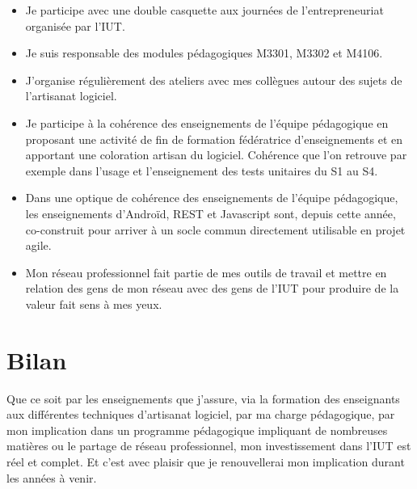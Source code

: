\documentclass[a4paper]{article}
\begin{document}
\begin{itemize}
  \item Je participe avec une double casquette aux journées de l'entrepreneuriat organisée par l'IUT.
  \item Je suis responsable des modules pédagogiques M3301, M3302 et M4106.
  \item J'organise régulièrement des ateliers avec mes collègues autour des sujets de l'artisanat logiciel.
  \item Je participe à la cohérence des enseignements de l'équipe pédagogique en proposant une activité de fin de formation fédératrice d'enseignements et en apportant une coloration artisan du logiciel. Cohérence que l'on retrouve par exemple dans l'usage et l'enseignement des tests unitaires du S1 au S4.
  \item Dans une optique de cohérence des enseignements de l'équipe pédagogique, les enseignements d'Androïd, REST et Javascript sont, depuis cette année, co-construit pour arriver à un socle commun directement utilisable en projet agile.
  \item Mon réseau professionnel fait partie de mes outils de travail et mettre en relation des gens de mon réseau avec des gens de l'IUT pour produire de la valeur fait sens à mes yeux.
\end{itemize}


\section{Bilan}

Que ce soit par les enseignements que j'assure, via la formation des enseignants aux différentes techniques d'artisanat logiciel, par ma charge pédagogique, par mon implication dans un programme pédagogique impliquant de nombreuses matières ou le partage de réseau professionnel, mon investissement dans l'IUT est réel et complet. Et c'est avec plaisir que je renouvellerai mon implication durant les années à venir.
\end{document}
